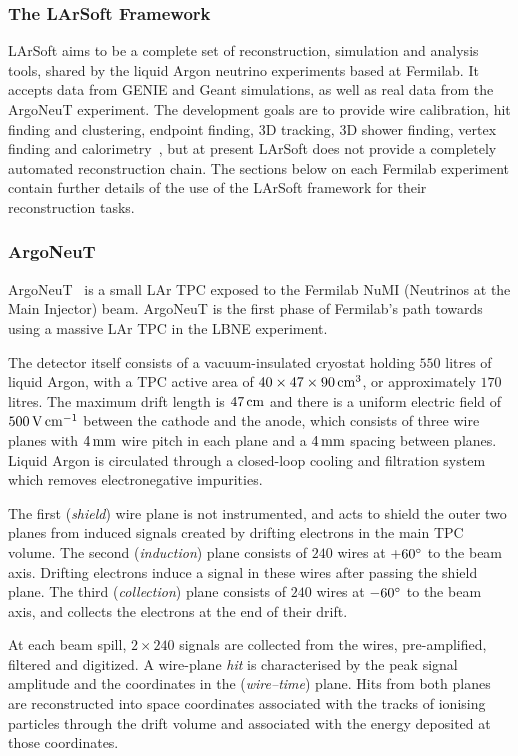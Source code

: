 \subsubsection{The LArSoft Framework}
LArSoft aims to be a complete set of reconstruction, simulation and analysis tools, shared by the liquid Argon neutrino experiments based at Fermilab. It accepts data from GENIE and Geant simulations, as well as real data from the ArgoNeuT experiment. The development goals are to provide wire calibration, hit finding and clustering, endpoint finding, 3D tracking, 3D shower finding, vertex finding and calorimetry~\citep{LArSoft2011}, but at present LArSoft does not provide a completely automated reconstruction chain. The sections below on each Fermilab experiment contain further details of the use of the LArSoft framework for their reconstruction tasks.

\subsubsection{ArgoNeuT}
ArgoNeuT~\citep{ArgoNeuT} is a small \acs{LAr TPC} exposed to the Fermilab NuMI (Neutrinos at the Main Injector) beam. ArgoNeuT is the first phase of Fermilab's path towards using a massive \acs{LAr TPC} in the LBNE experiment.

The detector itself consists of a vacuum-insulated cryostat holding $550$ litres of liquid Argon, with a \acs{TPC} active area of $40\times47\times90\,\mathrm{cm}^3$, or approximately $170$ litres. The maximum drift length is $47\,\mathrm{cm}$ and there is a uniform electric field of $500\,\mathrm{V}\,\mathrm{cm}^{-1}$ between the cathode and the anode, which consists of three wire planes with $4\,\mathrm{mm}$ wire pitch in each plane and a $4\,\mathrm{mm}$ spacing between planes. Liquid Argon is circulated through a closed-loop cooling and filtration system which removes electronegative impurities.

The first (\emph{shield}) wire plane is not instrumented, and acts to shield the outer two planes from induced signals created by drifting electrons in the main \acs{TPC} volume. The second (\emph{induction}) plane consists of $240$ wires at $+60^\circ$ to the beam axis. Drifting electrons induce a signal in these wires after passing the shield plane. The third (\emph{collection}) plane consists of $240$ wires at $-60^\circ$ to the beam axis, and collects the electrons at the end of their drift.

At each beam spill, $2\times240$ signals are collected from the wires, pre-amplified, filtered and digitized. A wire-plane \emph{hit} is characterised by the peak signal amplitude and the coordinates in the (\emph{wire--time}) plane. Hits from both planes are reconstructed into space coordinates associated with the tracks of ionising particles through the drift volume and associated with the energy deposited at those coordinates.

